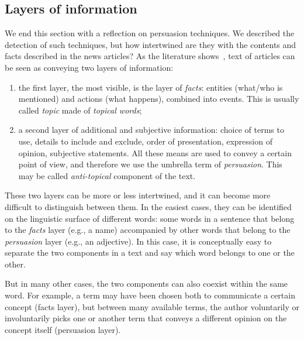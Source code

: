 \subsection{\statusgreen Layers of information}
\label{ssec:lit_layers_of_info}
We end this section with a reflection on persuasion techniques.
We described the detection of such techniques, but how intertwined are they with the contents and facts described in the news articles?
As the literature shows~\citep{jenkins2013thin,vanderwicken1995news,jang2023proximate}, text of articles can be seen as conveying two layers of information:
\begin{enumerate}
    \item the first layer, the most visible, is the layer of \emph{facts}: entities (what/who is mentioned) and actions (what happens), combined into events. This is usually called \emph{topic} made of \emph{topical words};
    \item a second layer of additional and subjective information: choice of terms to use, details to include and exclude, order of presentation, expression of opinion, subjective statements. All these means are used to convey a certain point of view, and therefore we use the umbrella term of \emph{persuasion}. This may be called \emph{anti-topical} component of the text.
\end{enumerate}



These two layers can be more or less intertwined, and it can become more difficult to distinguish between them.
In the easiest cases, they can be identified on the linguistic surface of different words: some words in a sentence that belong to the \emph{facts} layer (e.g., a name) accompanied by other words that belong to the \emph{persuasion} layer (e.g., an adjective).
In this case, it is conceptually easy to separate the two components in a text and say which word belongs to one or the other.

But in many other cases, the two components can also coexist within the same word. For example, a term may have been chosen both to communicate a certain concept (facts layer), but between many available terms, the author voluntarily or involuntarily picks one or another term that conveys a different opinion on the concept itself (persuasion layer).

